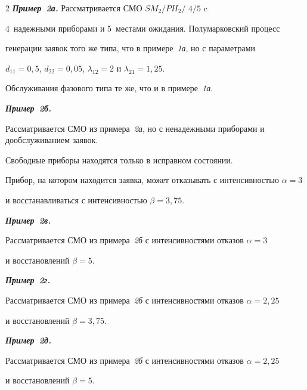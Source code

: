 \begin{multicols}{2}
{\bfseries\textit{Пример~2а.}} Рассматривается СМО $SM_2/PH_2/$ $4/5$ c 


4~надежными приборами и 5~мес\-та\-ми ожидания. Полумарковский процесс 


генерации заявок того же типа, что в примере~\textit{1а}, но с параметрами 


$d_{11}=0{,}5$, $d_{22}=0{,}05$, $\lambda_{12}=2$ и $\lambda_{21}=1{,}25$. 


Обслуживания фазового типа те же, что и в примере~\textit{1а}.





{\bfseries\textit{Пример~2б.}}


Рассматривается СМО из примера~\textit{2а}, но с ненадежными приборами и дообслуживанием заявок.


Свободные приборы находятся только в исправном состоянии.


Прибор, на котором находится заявка, может отказывать с интенсивностью $\alpha = 3$


и восстанавливаться с интенсивностью $\beta= 3{,}75$.





{\bfseries\textit{Пример~2в.}}


Рассматривается СМО из примера~\textit{2б} с интенсивностями отказов $\alpha = 3$


и восстановлений $\beta= 5$.





{\bfseries\textit{Пример~2г.}}


Рассматривается СМО из примера~\textit{2б} с интенсивностями отказов $\alpha = 2{,}25$


и восстановлений $\beta= 3{,}75$.





{\bfseries\textit{Пример~2д.}}


Рассматривается СМО из примера~\textit{2б} с интенсивностями отказов $\alpha = 2{,}25$


и восстановлений $\beta= 5$.





\begin{figure} %


\vspace*{1pt}


\begin{center}



\end{center}
\end{figure}
\end{multicols}
